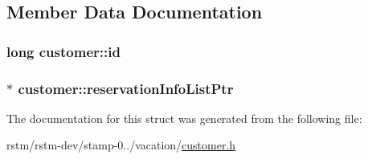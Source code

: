 \subsection{Member Data Documentation}
\hypertarget{structcustomer_a8e46257d66f8dba2d242342525dc35bf}{
\subsubsection[{id}]{\setlength{\rightskip}{0pt plus 5cm}long customer\-::id}}\label{structcustomer_a8e46257d66f8dba2d242342525dc35bf}
\hypertarget{structcustomer_a4e371b258aaa4b5621369db7619b5a1c}{
\subsubsection[{reservation\-Info\-List\-Ptr}]{$\ast$ customer\-::reservation\-Info\-List\-Ptr}}\label{structcustomer_a4e371b258aaa4b5621369db7619b5a1c}


The documentation for this struct was generated from the following file\-:\begin{DoxyCompactItemize}
\item 
rstm/rstm-\/dev/stamp-\/0../vacation/\hyperlink{customer_8h}{customer.\-h}\end{DoxyCompactItemize}
